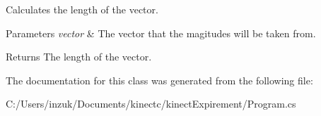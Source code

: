 Calculates the length of the vector. 


\begin{DoxyParams}{Parameters}
{\em vector} & The vector that the magitudes will be taken from. \\
\hline
\end{DoxyParams}
\begin{DoxyReturn}{Returns}
The length of the vector. 
\end{DoxyReturn}


The documentation for this class was generated from the following file\+:\begin{DoxyCompactItemize}
\item 
C\+:/\+Users/inzuk/\+Documents/kinectc/kinect\+Expirement/Program.\+cs\end{DoxyCompactItemize}
